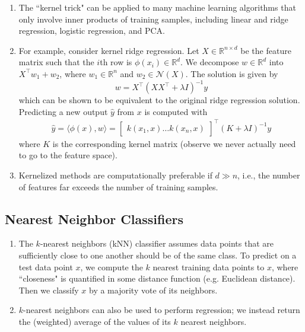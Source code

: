 \documentclass[10pt]{article}
\begin{document}
\begin{multicols}{2}
\begin{addmargin}[0.8em]{0.5em}
\begin{enumerate}[label=(\alph*)]
        \item The ``kernel trick" can be applied to many machine learning algorithms that only involve inner products of training samples, including linear and ridge regression, logistic regression, and PCA.
        
        \item For example, consider kernel ridge regression. Let $X \in \mathbb{R}^{n \times d}$ be the feature matrix such that the $i$th row is $\phi(x_i) \in \mathbb{R}^d$. We decompose $w \in \mathbb{R}^d$ into $X^\top w_1 + w_2$, where $w_1 \in \mathbb{R}^n$ and $w_2 \in \mathcal{N}(X)$. The solution is given by
        $$
        w = X^\top (XX^\top + \lambda I)^{-1} y
        $$
        which can be shown to be equivalent to the original ridge regression solution. Predicting a new output $\hat{y}$ from $x$ is computed with
        \begin{align*}
            \hat{y} = \langle \phi(x), w \rangle = \begin{bmatrix} k(x_1, x)  \hdots  k(x_n, x) \end{bmatrix}^\top (K + \lambda I)^{-1} y
        \end{align*}
        where $K$ is the corresponding kernel matrix (observe we never actually need to go to the feature space). 
        
        \item Kernelized methods are computationally preferable if $d \gg n$, i.e., the number of features far exceeds the number of training samples.
    \end{enumerate}     
    
    \subsection{Nearest Neighbor Classifiers}
    \begin{enumerate}[label=(\alph*)]
        \item The $k$-nearest neighbors (kNN) classifier assumes data points that are sufficiently close to one another should be of the same class. To predict on a test data point $x$, we compute the $k$ nearest training data points to $x$, where ``closeness" is quantified in some distance function (e.g. Euclidean distance). Then we classify $x$ by a majority vote of its neighbors. 
        \item $k$-nearest neighbors can also be used to perform regression; we instead return the (weighted) average of the values of its $k$ nearest neighbors.
        

\end{enumerate}
\end{addmargin}
\end{multicols}
\end{document}
